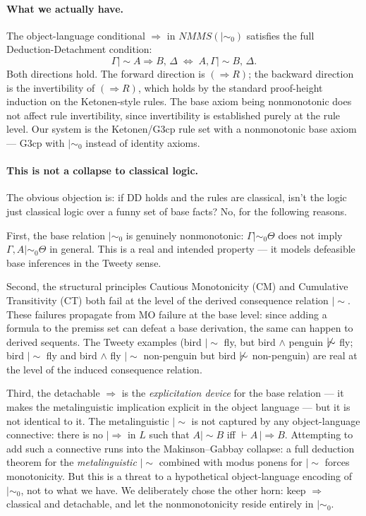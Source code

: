 \documentclass[a4paper,11pt]{report}
\newcommand{\ms}{\mathrel{\mid\!\sim}}
\newcommand{\mszero}{\mathrel{\mid\!\sim_{0}}}
\begin{document}
\paragraph{What we actually have.}
The object-language conditional $\Rightarrow$ in $\mathit{NMMS}(\mszero)$ satisfies the
full Deduction-Detachment condition:
\[
  \Gamma \ms A \Rightarrow B,\, \Delta \;\iff\; A, \Gamma \ms B,\, \Delta.
\]
Both directions hold. The forward direction is $(\Rightarrow R)$; the backward direction
is the invertibility of $(\Rightarrow R)$, which holds by the standard proof-height
induction on the Ketonen-style rules. The base axiom being nonmonotonic does not affect
rule invertibility, since invertibility is established purely at the rule level.
Our system is the Ketonen/G3cp rule set with a nonmonotonic base axiom --- G3cp with
$\mszero$ instead of identity axioms.

\paragraph{This is not a collapse to classical logic.}
The obvious objection is: if DD holds and the rules are classical, isn't the logic just
classical logic over a funny set of base facts? No, for the following reasons.

First, the base relation $\mszero$ is genuinely nonmonotonic: $\Gamma \mszero \Theta$ does
not imply $\Gamma, A \mszero \Theta$ in general. This is a real and intended property ---
it models defeasible base inferences in the Tweety sense.

Second, the structural principles Cautious Monotonicity (CM) and Cumulative Transitivity
(CT) both fail at the level of the derived consequence relation $\ms$. These failures
propagate from MO failure at the base level: since adding a formula to the premiss set can
defeat a base derivation, the same can happen to derived sequents. The Tweety examples
(bird $\ms$ fly, but bird $\wedge$ penguin $\not\ms$ fly; bird $\ms$ fly and bird
$\wedge$ fly $\ms$ non-penguin but bird $\not\ms$ non-penguin) are real at the level
of the induced consequence relation.

Third, the detachable $\Rightarrow$ is the \emph{explicitation device} for the base
relation --- it makes the metalinguistic implication explicit in the object language ---
but it is not identical to it. The metalinguistic $\ms$ is not captured by any
object-language connective: there is no $|\Rightarrow$ in $L$ such that $A \ms B$ iff
$\vdash A \,|\Rightarrow B$. Attempting to add such a connective runs into the
Makinson--Gabbay collapse: a full deduction theorem for the \emph{metalinguistic}
$\mathrel{|\!\sim}$ combined with modus ponens for $\mathrel{|\!\sim}$ forces
monotonicity. But this is a threat to a hypothetical object-language encoding of
$\mszero$, not to what we have. We deliberately chose the other horn: keep $\Rightarrow$
classical and detachable, and let the nonmonotonicity reside entirely in $\mszero$.
\end{document}
